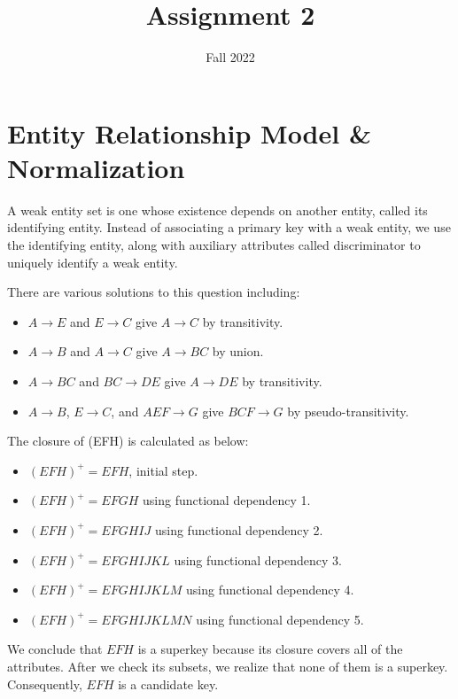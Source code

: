 \documentclass{homework}
\author{}
\date{Fall 2022}
\title{Assignment 2}
\begin{document}
 \maketitle

\section*{Entity Relationship Model \& Normalization}
\question A weak entity set is one whose existence depends on another entity, called its identifying entity. Instead of associating a primary key with a weak entity, we use the identifying entity, along with auxiliary attributes called discriminator to uniquely identify a weak entity.


\question
{}

\question 
There are various solutions to this question including:
\begin{itemize}
    \item $A\rightarrow E$ and $E\rightarrow C$ give $A \rightarrow C$ by transitivity.
    \item $A \rightarrow B$ and $A \rightarrow C$ give $A \rightarrow BC$ by union.
    \item $A \rightarrow BC$ and $BC\rightarrow DE$ give $A \rightarrow DE$ by transitivity.
    \item $A \rightarrow B$, $E \rightarrow C$, and $AEF\rightarrow G$ give $BCF \rightarrow G$ by pseudo-transitivity.
 
\end{itemize}

\question The closure of (EFH) is calculated as below:
\begin{itemize}
    \item $(EFH)^+ = EFH$, initial step.
    \item $(EFH)^+ = EFGH$ using functional dependency 1.
    \item $(EFH)^+ = EFGHIJ$ using functional dependency 2.
    \item $(EFH)^+ = EFGHIJKL$ using functional dependency 3.
    \item $(EFH)^+ = EFGHIJKLM$ using functional dependency 4.
    \item $(EFH)^+ = EFGHIJKLMN$ using functional dependency 5.
\end{itemize}
We conclude that $EFH$ is a superkey because its closure covers all of the attributes. After we check its subsets, we realize that none of them is a superkey. Consequently, $EFH$ is a candidate key.
\end{document}
